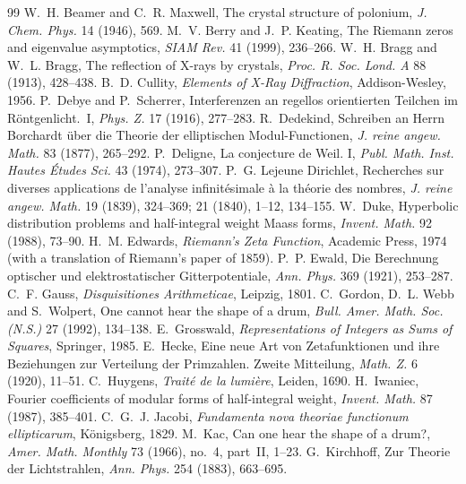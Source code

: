 \documentclass[11pt]{article}
\begin{document}
\begin{thebibliography}{99}\small
{} W.~H. Beamer and C.~R. Maxwell, The crystal structure of polonium, \emph{J. Chem. Phys.} 14 (1946), 569.
 M.~V. Berry and J.~P. Keating, The Riemann zeros and eigenvalue asymptotics, \emph{SIAM Rev.} 41 (1999), 236--266.
 W.~H. Bragg and W.~L. Bragg, The reflection of X-rays by crystals, \emph{Proc. R. Soc. Lond. A} 88 (1913), 428--438.
 B.~D. Cullity, \emph{Elements of X-Ray Diffraction}, Addison-Wesley, 1956.
 P.~Debye and P.~Scherrer, Interferenzen an regellos orientierten Teilchen im R\"ontgenlicht.~I, \emph{Phys. Z.} 17 (1916), 277--283.
 R.~Dedekind, Schreiben an Herrn Borchardt \"uber die Theorie der elliptischen Modul-Functionen, \emph{J. reine angew. Math.} 83 (1877), 265--292.
 P.~Deligne, La conjecture de Weil. I, \emph{Publ. Math. Inst. Hautes \'Etudes Sci.} 43 (1974), 273--307.
 P.~G. Lejeune Dirichlet, Recherches sur diverses applications de l'analyse infinit\'esimale \`a la th\'eorie des nombres, \emph{J. reine angew. Math.} 19 (1839), 324--369; 21 (1840), 1--12, 134--155.
 W.~Duke, Hyperbolic distribution problems and half-integral weight Maass forms, \emph{Invent. Math.} 92 (1988), 73--90.
 H.~M. Edwards, \emph{Riemann's Zeta Function}, Academic Press, 1974 (with a translation of Riemann's paper of 1859).
 P.~P. Ewald, Die Berechnung optischer und elektrostatischer Gitterpotentiale, \emph{Ann. Phys.} 369 (1921), 253--287.
 C.~F. Gauss, \emph{Disquisitiones Arithmeticae}, Leipzig, 1801.
 C.~Gordon, D.~L. Webb and S.~Wolpert, One cannot hear the shape of a drum, \emph{Bull. Amer. Math. Soc. (N.S.)} 27 (1992), 134--138.
 E.~Grosswald, \emph{Representations of Integers as Sums of Squares}, Springer, 1985.
 E.~Hecke, Eine neue Art von Zetafunktionen und ihre Beziehungen zur Verteilung der Primzahlen. Zweite Mitteilung, \emph{Math. Z.} 6 (1920), 11--51.
 C.~Huygens, \emph{Trait\'e de la lumi\`ere}, Leiden, 1690.
 H.~Iwaniec, Fourier coefficients of modular forms of half-integral weight, \emph{Invent. Math.} 87 (1987), 385--401.
 C.~G.~J. Jacobi, \emph{Fundamenta nova theoriae functionum ellipticarum}, K\"onigsberg, 1829.
 M.~Kac, Can one hear the shape of a drum?, \emph{Amer. Math. Monthly} 73 (1966), no.~4, part~II, 1--23.
 G.~Kirchhoff, Zur Theorie der Lichtstrahlen, \emph{Ann. Phys.} 254 (1883), 663--695.

\end{thebibliography}
\end{document}
